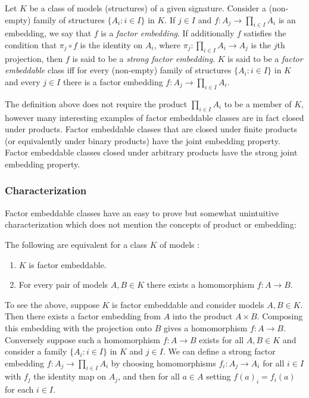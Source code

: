 \documentclass[12pt]{article}
\begin{document}
Let $K$ be a class of models (structures) of a given signature. Consider a (non-empty) family of structures $ \{ A_{i}:i \in I \} $ in $K$. If $j \in I$ and $f : A_{j} \rightarrow \prod_{i \in I}A_{i}$ is an embedding, we say that $f$ is a \emph{factor embedding}. \cite{VC, UM} If additionally $f$ satisfies the condition that $\pi_{j}\circ f$ is the identity on $A_{i}$, where $\pi_{j} : \prod_{i \in I}A_{i} \rightarrow A_{j}$ is the $j$th projection, then $f$ is said to be a \emph{strong factor embedding}. \cite{UM} $K$ is said to be a \emph{factor embeddable} class iff for every (non-empty) family of structures $ \{ A_{i}:i \in I \} $ in $K$ and every $j \in I$ there is a factor embedding $f : A_{j} \rightarrow \prod_{i \in I}A_{i}$. \cite{VC, UM}

The definition above does not require the product $\prod_{i \in I}A_{i}$ to be a member of $K$, however many interesting examples of factor embeddable classes are in fact closed under products. Factor embeddable classes that are closed under finite products (or equivalently under binary products) have the joint embedding property. Factor embeddable classes closed under arbitrary products have the strong joint embedding property.

\subsubsection{Characterization}
Factor embeddable classes have an easy to prove but somewhat unintuitive characterization which does not mention the concepts of product or embedding:

The following are equivalent for a class $K$ of models \cite{UM}: 

\begin{enumerate}
\item $K$ is factor embeddable.
\item For every pair of models $A,B \in K$ there exists a homomorphism $f : A \rightarrow B$.
\end{enumerate}

To see the above, suppose $K$ is factor embeddable and consider models $A,B \in K$. Then there exists a factor embedding from $A$ into the product $A \times B$. Composing this embedding with the projection onto $B$ gives a homomorphism $f : A \rightarrow B$. Conversely suppose such a homomorphism $f : A \rightarrow B$ exists for all $A,B \in K$ and consider a family $ \{ A_{i}:i \in I \} $ in $K$ and $j \in I$. We can define a strong factor embedding 
$f : A_{j} \rightarrow \prod_{i \in I}A_{i}$ by choosing homomorphisms $f_{i} : A_{j} \rightarrow A_{i}$ for all $i \in I$ with $f_{j}$ the identity map on $A_{j}$, and then for all $a \in A$ setting $f(a)_{i} = f_{i}(a)$ for each $i \in I$. \cite{UM}
\end{document}
